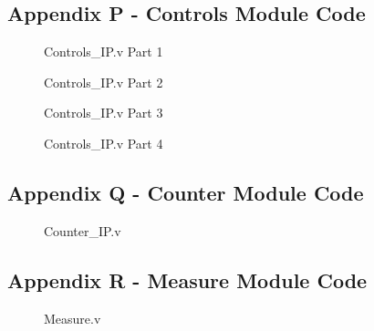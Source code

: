 \documentclass[a4paper,12pt]{article}
\begin{document}
\subsection{Appendix P - Controls Module Code}
\begin{figure}[H]
	\centering
	
		\caption{Controls\_IP.v Part 1}
\end{figure}
\newpage
\begin{figure}[H]
	\centering
	
		\caption{Controls\_IP.v Part 2}
\end{figure}
\newpage
\begin{figure}[H]
	\centering
	
		\caption{Controls\_IP.v Part 3}
\end{figure}
\newpage
\begin{figure}[H]
	\centering
	
		\caption{Controls\_IP.v Part 4}
\end{figure}
\newpage
\subsection{Appendix Q - Counter Module Code}
\begin{figure}[H]
	\centering
	
		\caption{Counter\_IP.v}
\end{figure}
\newpage
\subsection{Appendix R - Measure Module Code}
\begin{figure}[H]
	\centering
	
		\caption{Measure.v}
\end{figure}
\newpage
\end{document}
